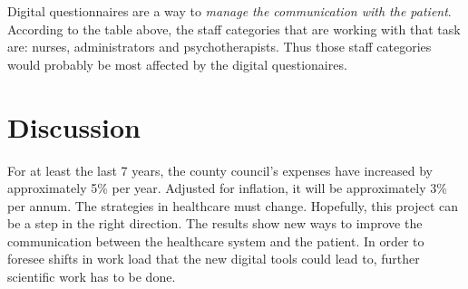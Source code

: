 \documentclass[12pt,a4paper,oneside]{article}
\let\oldcite\cite
\renewcommand*\cite[1]{\textsuperscript{\oldcite{#1}}}
\begin{document}
\newpage
Digital questionnaires are a way to {\it manage the communication with the patient}. According to the table above, the staff categories that are working with that task are: nurses, administrators and psychotherapists. Thus those staff categories would probably be most affected by the digital questionaires.



\section*{Discussion}
For at least the last 7 years, the county council's expenses have increased by approximately 5\% per year. Adjusted for inflation, it will be approximately 3\% per annum\cite{numbers3.1, numbers3.2}. The strategies in healthcare must change. Hopefully, this project can be a step in the right direction. The results show new ways to improve the communication between the healthcare system and the patient. 
In order to foresee shifts in work load that the new digital tools could lead to, further scientific work has to be done. %
\end{document}
